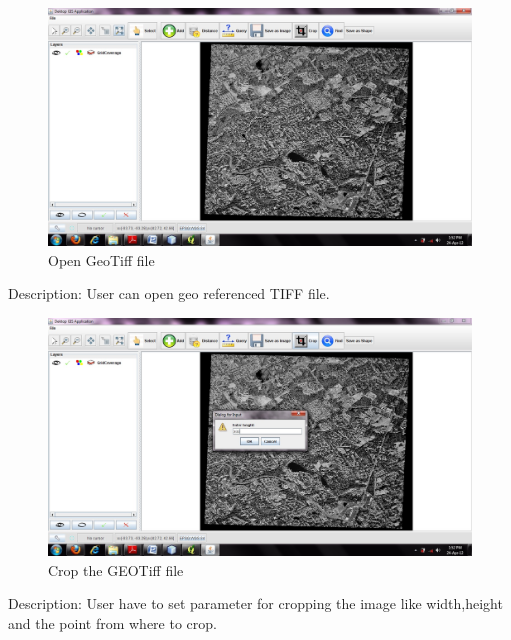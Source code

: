 \begin{figure}[h]
\begin{center}
  \includegraphics[scale=0.43] {13.jpg}
  \caption[Screenshot - GeoTiff File]{Open GeoTiff file}
\end{center}
\end{figure}
Description: User can open geo referenced TIFF file.

\newpage
\begin{figure}[h]
\begin{center}
  \includegraphics[scale=0.43] {14.jpg}
  \caption[Screenshot - Crop]{Crop the GEOTiff file}
\end{center}
\end{figure}
Description: User have to set parameter for cropping the image like width,height and the point from where to crop.
\newpage


